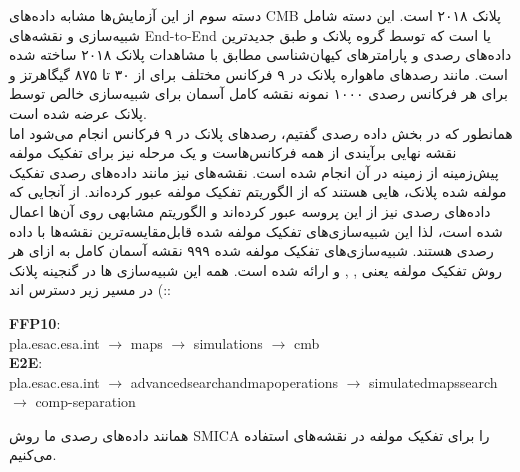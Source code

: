  دسته سوم از این آزمایش‌ها مشابه داده‌های CMB پلانک ۲۰۱۸ است. این دسته شامل شبیه‌سازی 
   و نقشه‌های End-to-End یا 
   است که توسط گروه پلانک و طبق جدیدترین داده‌های رصدی و پارامترهای کیهان‌شناسی مطابق با مشاهدات پلانک ۲۰۱۸ ساخته شده است.
مانند رصدهای ماهواره پلانک در ۹ فرکانس مختلف برای از ۳۰ تا ۸۷۵ گیگاهرتز و برای هر فرکانس رصدی ۱۰۰۰ نمونه نقشه کامل آسمان برای شبیه‌سازی 
 خالص توسط پلانک عرضه شده است.
 \cite{ffp}
 \\ همانطور که در بخش داده رصدی گفتیم، رصدهای پلانک در ۹ فرکانس انجام می‌شود اما نقشه نهایی برآیندی از همه فرکانس‌هاست و یک مرحله نیز برای تفکیک مولفه پیش‌زمینه از زمینه در آن انجام شده است. نقشه‌های   نیز مانند داده‌های رصدی تفکیک مولفه شده پلانک،  هایی هستند که از الگوریتم تفکیک مولفه عبور کرده‌اند. 
از آنجایی که داده‌های رصدی نیز از این پروسه عبور کرده‌اند و الگوریتم مشابهی روی آن‌ها اعمال شده است، لذا این شبیه‌سازی‌های تفکیک مولفه شده قابل‌مقایسه‌ترین نقشه‌ها با داده رصدی هستند. شبیه‌سازی‌های تفکیک مولفه‌ شده 
 ۹۹۹ نقشه آسمان کامل 
  به ازای هر روش تفکیک مولفه یعنی 
 , , 
 و 
 ارائه شده است.
 \cite{ade2016planck}
  همه این شبیه‌سازی ها در گنجینه پلانک
 :) در مسیر زیر دسترس اند:
 \begin{latin}
	\textbf{FFP10}: \\
pla.esac.esa.int $\to$ maps $\to$ simulations $\to$ cmb \\
	\textbf{E2E}: \\
pla.esac.esa.int $\to$ advanced\;search\;and\;map\;operations $\to$ simulated\;maps\;search $\to$ comp-separation
 \end{latin}
همانند داده‌های رصدی ما روش SMICA را برای تفکیک مولفه در نقشه‌های 
استفاده می‌کنیم. 

 
